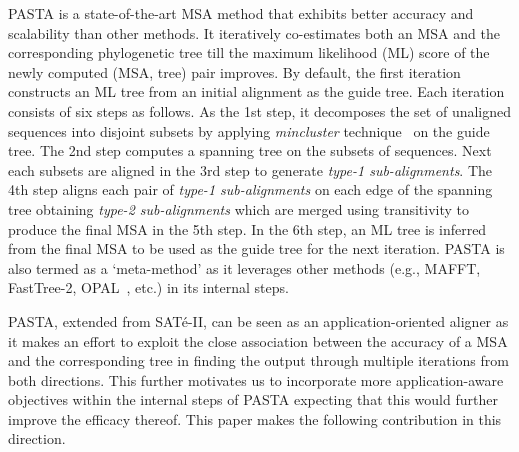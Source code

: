 PASTA is a state-of-the-art MSA method that exhibits better accuracy and scalability than other methods. It iteratively co-estimates both an MSA and the corresponding phylogenetic tree till the maximum likelihood (ML) score of the newly computed (MSA, tree) pair improves. By default, the first iteration constructs an ML tree from an initial alignment as the guide tree. Each iteration consists of six steps as follows. As the 1st step, it decomposes the set of unaligned sequences into disjoint subsets by applying \textit{mincluster} technique~\cite{balaban2019treecluster} on the guide tree. The 2nd step computes a spanning tree on the subsets of sequences. Next each subsets are aligned in the 3rd step to generate \textit{type-1 sub-alignments}. The 4th step aligns each pair of \textit{type-1 sub-alignments} on each edge of the spanning tree obtaining \textit{type-2 sub-alignments} which are merged using transitivity to produce the final MSA in the 5th step. In the 6th step, an ML tree is inferred from the final MSA to be used as the guide tree for the next iteration. PASTA is also termed as a `meta-method' as it leverages other methods (e.g., MAFFT, FastTree-2, OPAL~\cite{wheeler2007multiple}, etc.) in its internal steps. 

PASTA, extended from SAT\'e-II, can be seen as an application-oriented aligner 
as it makes an effort to exploit the close association between the
accuracy of a MSA and the corresponding tree in finding
the output through multiple iterations from both directions. 
This further motivates us to incorporate more application-aware objectives within the internal steps of PASTA expecting that this would further improve the efficacy thereof. This paper makes the following contribution in this direction. 


